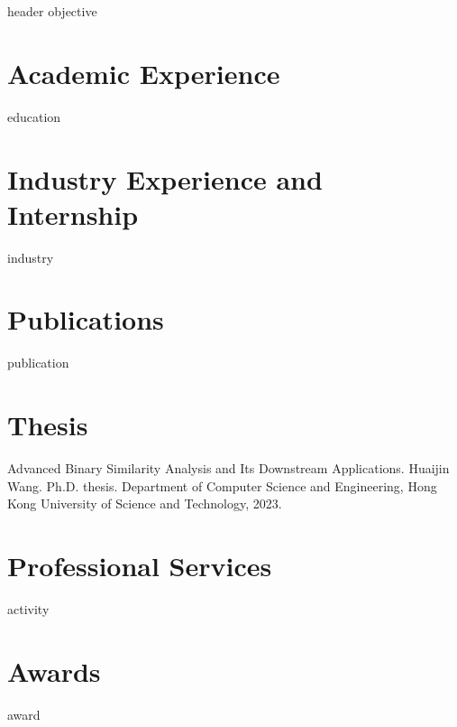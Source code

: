 \documentclass[letter,10pt]{article}
\begin{document}
{header}
{objective}

\section{Academic Experience}
{education}

\section{Industry Experience and Internship}
{industry}


\section{Publications}
{publication}



\section{Thesis}
Advanced Binary Similarity Analysis and Its Downstream Applications.
Huaijin Wang. Ph.D. thesis. Department of Computer Science and Engineering, Hong Kong University of Science and Technology, 2023.


\section{Professional Services}
{activity}

\section{Awards}
{award}

\end{document}
